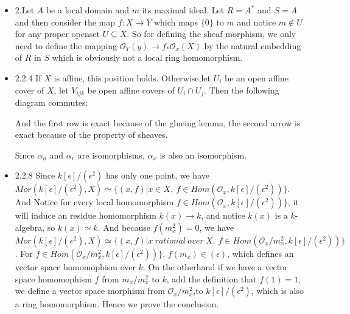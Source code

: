 \documentclass[12pt]{article}
\begin{document}
\begin{itemize}
\item 2.Let $A$ be a local domain and $m$ its maximal ideal. Let $R=A^*$ and $S=A$ and then consider the map $f: X\to Y$ which maps $\{0\}$ to $m$ and notice $m \notin U$ for any proper openset $U\subseteq X$. So for defining the sheaf morphism, we only need to define the mapping $\mathcal{O}_Y(y)\rightarrow f_* \mathcal{O}_x(X)$ by the natural embedding of $R$ in $S$ which is obviously not a local ring homomorphism.
\item 2.2.4 If $X$ is affine, this position holds. Otherwise,let $U_i$ be an open affine cover of $X$, let $V_{ijk}$ be open affine covers of $U_i\cap U_j$. Then the following diagram commutes:
    


And the first row is exact because of the glueing lemma, the second arrow is exact because of the property of sheaves.

Since $\alpha_u$ and $\alpha_v$ are isomorphisms, $\alpha_x$ is also an isomorphism.
\item 2.2.8 Since $k[\epsilon]/(\epsilon^2)$ has only one point, we have $Mor(k[\epsilon]/(\epsilon^2),X) \simeq \{(x,f)| x\in X,\ f\in Hom(\mathcal{O}_x, k[\epsilon]/(\epsilon^2))\}$. And Notice for every local homomorphism   $f\in Hom(\mathcal{O}_x, k[\epsilon]/(\epsilon^2))\}$, it will induce an residue homomorphism $k(x)\to k$, and notice $k(x)$ is a $k$-algebra, so $k(x)\simeq k$. And because $f(m_x^2)=0$, we have $Mor(k[\epsilon]/(\epsilon^2),X) \simeq \{(x,f)| x \ rational \ over \  X,\ f\in Hom(\mathcal{O}_x/m_x^2, k[\epsilon]/(\epsilon^2))\}$. For $f\in Hom(\mathcal{O}_x/m_x^2, k[\epsilon]/(\epsilon^2))\}$, $f(m_x)\in (\epsilon)$, which defines an vector space homomophism over $k$. On the otherhand if we have a vector space homomophism $f$ from $m_x/m_x^2$ to $k$, add the definition that $f(1)=1$, we define a vector space morphism from  $\mathcal{O}_x/m_x^2$,to $k[\epsilon]/(\epsilon^2)$, which is also a ring homomorphism. 
Hence we prove the conclusion.


\end{itemize}
\end{document}
